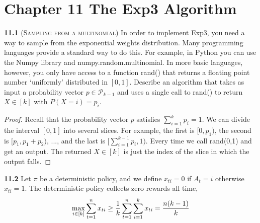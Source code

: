 

\chapter*{Chapter 11 The Exp3 Algorithm}
\label{sec:11}

\noindent\textbf{11.1} (\textsc{Sampling from a multinomial}) In order to implement Exp3, you need a way to sample from the exponential weights distribution. Many programming languages provide a standard way to do this. For example, in Python you can use the Numpy library and numpy.random.multinomial. In more basic languages, however, you only have access to a function rand() that returns a floating point number `uniformly' distributed in $[0, 1]$. Describe an algorithm that takes as input a probability vector $p \in \mathcal{P}_{k-1}$ and uses a single call to rand() to return $X \in [k]$ with $P (X = i) = p_i$.

\begin{proof}
Recall that the probability vector $p$ satisfies $\sum_{i=1}^k p_i = 1$. We can divide the interval $[0,1]$ into several slices. For example, the first is $[0,p_1)$, the second is $[p_1,p_1+p_2)$, ..., and the last is $[\sum_{i=1}^{k-1} p_i, 1)$. Every time we call rand(0,1) and get an output. The returned $X\in[k]$ is just the index of the slice in which the output falls. 
\end{proof}








\noindent\textbf{11.2} Let $\pi$ be a deterministic policy, and we define $x_{ti}=0$ if $A_t=i$ otherwise $x_{ti}=1$. The deterministic policy collects zero rewards all time,
\begin{equation}
    \max _{i \in[k]} \sum_{t=1}^{n} x_{t i} \geq \frac{1}{k} \sum_{t=1}^{n} \sum_{i=1}^{k} x_{t i}=\frac{n(k-1)}{k} \notag
\end{equation}

